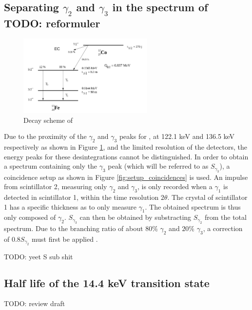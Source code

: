 \subsection{Separating \(\gamma_2\) and \(\gamma_3\) in the spectrum of \cobalt TODO: reformuler}
\label{sec:seperation}

\begin{figure}[htbp]
    \centering
    \includegraphics[width=0.6\textwidth]{figures/decay_cobalt57.png}
    \caption{Decay scheme of \cobalt \cite{notice_VI}}
    \label{fig:cobalt_decay}
\end{figure}

Due to the proximity of the \(\gamma_2\) and \(\gamma_3\) peaks for \cobalt, at 122.1 keV and 136.5 keV respectively as shown in Figure \ref{fig:cobalt_decay}, and the limited resolution of the detectors, the energy peaks for these desintegrations cannot be distinguished. In order to obtain a spectrum containing only the \(\gamma_3\) peak (which will be referred to as \(S_{\gamma_3}\)), a coincidence setup as shown in Figure \ref{fig:setup_coincidences} is used. An impulse from scintillator 2, measuring only \(\gamma_2\) and \(\gamma_3\), is only recorded when a \(\gamma_1\) is detected in scintillator 1, within the time resolution \(2\theta\). The crystal of scintillator 1 has a specific thickness as to only measure \(\gamma_1\). The obtained spectrum is thus only composed of \(\gamma_2\). \(S_{\gamma_3}\) can then be obtained by substracting \(S_{\gamma_2}\) from the total spectrum. Due to the branching ratio of about \(80\%\) \(\gamma_2\) and \(20\%\) \(\gamma_3\), a correction of \(0.8 S_{\gamma_2}\) must first be applied \cite{notice_VI}.

TODO: yeet S sub shit

\subsection{Half life of the 14.4 keV transition state}
\label{sec:half_life}

TODO: review draft

